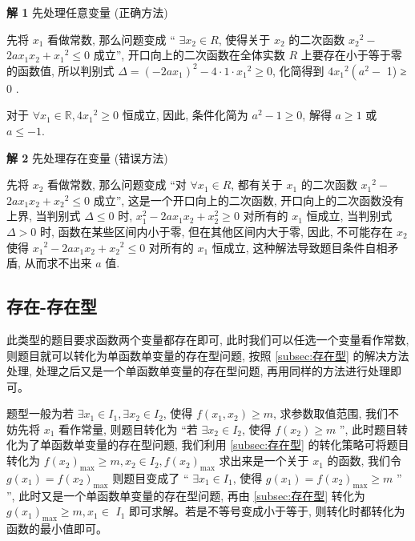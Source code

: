 \noindent\textbf{解 1} 先处理任意变量 (正确方法)

先将 \({x}_{1}\) 看做常数, 那么问题变成 “ \(\exists {x}_{2} \in  R\), 使得关于 \({x}_{2}\) 的二次函数 \({x}_{2}{}^{2} -\)  \({2a}{x}_{1}{x}_{2} + {x}_{1}{}^{2} \leq  0\) 成立”, 开口向上的二次函数在全体实数 \(R\) 上要存在小于等于零的函数值, 所以判别式 \(\Delta  = {\left( -2a{x}_{1}\right) }^{2} -4 \cdot  1 \cdot  {x}_{1}{}^{2} \geq  0\), 化简得到 \(4{x}_{1}{}^{2}\left( {{a}^{2} -}\right.\) 1) ≥ 0 .

对于 \(\forall {x}_{1} \in \mathbb{R}, 4{x}_{1}{}^{2} \geq  0\) 恒成立, 因此, 条件化简为 \({a}^{2} -1 \geq  0\), 解得 \(a \geq 1\) 或 \(a \leq  -1\). 


\noindent\textbf{解 2} 先处理存在变量 (错误方法)

先将 \({x}_{2}\) 看做常数, 那么问题变成 “对 \(\forall {x}_{1} \in  R\), 都有关于 \({x}_{1}\) 的二次函数 \({x}_{1}{}^{2} -\)  \({2a}{x}_{1}{x}_{2} + {x}_{2}{}^{2} \leq  0\) 成立”, 这是一个开口向上的二次函数, 开口向上的二次函数没有上界, 当判别式 \(\Delta  \leq  0\) 时, \({x}_{1}^{2} -{2a}{x}_{1}{x}_{2} + {x}_{2}^{2} \geq  0\) 对所有的 \({x}_{1}\) 恒成立, 当判别式 \(\Delta  > 0\) 时, 函数在某些区间内小于零, 但在其他区间内大于零, 因此, 不可能存在 \({x}_{2}\) 使得 \({x}_{1}{}^{2} -{2a}{x}_{1}{x}_{2} + {x}_{2}{}^{2} \leq  0\) 对所有的 \({x}_{1}\) 恒成立, 这种解法导致题目条件自相矛盾, 从而求不出来 \(a\) 值.



\subsection{存在-存在型}\label{subsec:存在-存在型}
此类型的题目要求函数两个变量都存在即可, 此时我们可以任选一个变量看作常数, 则题目就可以转化为单函数单变量的存在型问题, 按照 \ref{subsec:存在型} 的解决方法处理, 处理之后又是一个单函数单变量的存在型问题, 再用同样的方法进行处理即可。

题型一般为若 \(\exists {x}_{1} \in  {I}_{1}, \exists {x}_{2} \in  {I}_{2}\), 使得 \(f(x_1, x_2)  \geq  m\), 求参数取值范围, 我们不妨先将 \({x}_{1}\) 看作常量, 则题目转化为 “若 \(\exists {x}_{2} \in  {I}_{2}\), 使得 \(f\left( {x}_{2}\right)  \geq  m\) ”, 此时题目转化为了单函数单变量的存在型问题, 我们利用 \ref{subsec:存在型} 的转化策略可将题目转化为 \(f{\left( {x}_{2}\right) }_{\max } \geq  m, {x}_{2} \in  {I}_{2}, f{\left( {x}_{2}\right) }_{\max }\) 求出来是一个关于 \({x}_{1}\) 的函数, 我们令 \(g\left( {x}_{1}\right)  = f{\left( {x}_{2}\right) }_{\max }\) 则题目变成了 “ \(\exists {x}_{1} \in  {I}_{1}\), 使得 \(g\left( {x}_{1}\right)  = f{\left( {x}_{2}\right) }_{\max } \geq  m\) ” ”, 此时又是一个单函数单变量的存在型问题, 再由 \ref{subsec:存在型} 转化为 \(g{\left( {x}_{1}\right) }_{\max } \geq  m, {x}_{1} \in\)  \({I}_{1}\) 即可求解。若是不等号变成小于等于, 则转化时都转化为函数的最小值即可。

